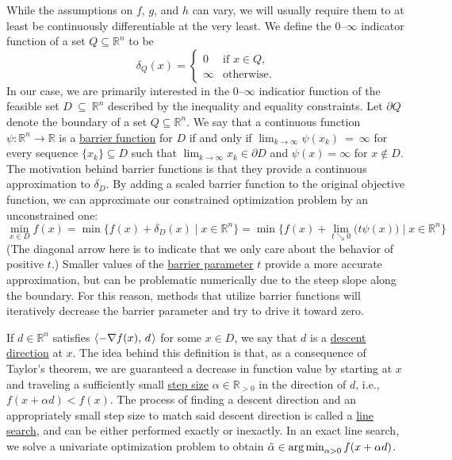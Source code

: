 \documentclass[12pt]{article}
\newcommand{\1}{\scalebox{1.06}{\ensuremath{\mathrel{\mathmybb{1}}}}}
\theoremstyle{definition}
\newcommand{\defn}[1]{\underline{#1}}
\newcommand{\R}{\mathbb{R}}
\DeclareMathOperator{\argmin}{\text{arg\! min}}
\begin{document}
While the assumptions on $f\!,\, g$, and $h$ can vary, we will usually require them to at least be continuously differentiable at the very least.
We define the $0$--$\infty$ indicator function of a set $Q \subseteq \R^n$ to be
\[
	\delta_Q(x) =
	\begin{cases}
	0 & \text{if $x \in Q$,} \\
	\infty & \text{otherwise.}
	\end{cases}
\]
In our case, we are primarily interested in the $0$--$\infty$ indicatior function of the feasible set $D ~\subseteq~ \R^n$ described by the inequality and equality
constraints.
Let $\partial Q$ denote the boundary of a set $Q \subseteq \R^n$.
We say that a continuous function $\psi \colon \R^n \to \R$ is a \defn{barrier function} for $D$ if and only if $\lim_{k\to\infty} \psi(x_k)~=~\infty$ for every sequence $\{x_k\} \subseteq D$ such that
$\lim_{k \to \infty} x_k \in \partial D$ and $\psi(x) = \infty$ for $x \notin D$. The motivation behind barrier functions is that they provide a continuous approximation to $\delta_D$. By adding a scaled barrier function to the original objective function, we can approximate
our constrained optimization problem by an unconstrained one:
\[
	\min_{x \in D} f(x)
	= \min\{f(x) + \delta_D(x) \mid x \in \R^n\}
	= \min\Big\{ f(x) + \lim_{t \searrow 0}\big( t \psi(x) \big) \mid  x \in \R^n \Big\}
\]
(The diagonal arrow here is to indicate that we only care about the behavior of positive $t$.)
Smaller values of the \defn{barrier parameter} $t$ provide a more accurate approximation, but can be problematic numerically due to the steep slope along the boundary.
For this reason, methods that utilize barrier functions will iteratively decrease the barrier parameter and try to drive it toward zero.

If $d \in \R^n$ satisfies $\langle -\nabla f(x),\, d\hspace{0.1em}\rangle$ for some $x \in D$, we say that $d$ is a \defn{descent direction} at $x$.
The idea behind this definition is that, as a consequence of Taylor's theorem, we are guaranteed a decrease in function value by starting at $x$ and traveling a sufficiently small \defn{step size} $\alpha \in \R_{>0}$ in the direction of $d$, i.e., $f(x + \alpha d) < f(x)$. The process of finding a descent direction and an appropriately small step size to match said descent direction is called a \defn{line search}, and can be either
performed exactly or inexactly. In an exact line search, we solve a univariate optimization problem to obtain $\tilde{\alpha} \in \argmin_{\alpha > 0}f(x + \alpha d)$.
\end{document}
